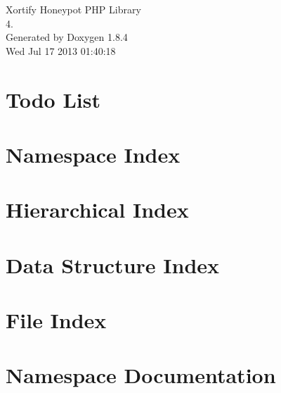 \documentclass[twoside]{book}
\newcommand{\clearemptydoublepage}{%
  \newpage{\pagestyle{empty}\cleardoublepage}%
}
\begin{document}
\hypersetup{pageanchor=false}
\begin{titlepage}
\vspace*{7cm}
\begin{center}%
{\Large Xortify Honeypot P\-H\-P Library \\[1ex]\large 4. }\\
\vspace*{1cm}
{\large Generated by Doxygen 1.8.4}\\
\vspace*{0.5cm}
{\small Wed Jul 17 2013 01:40:18}\\
\end{center}
\end{titlepage}
\clearemptydoublepage
\tableofcontents
\clearemptydoublepage
{}
\hypersetup{pageanchor=true}

\chapter{Todo List}
\label{todo}
\hypertarget{todo}{}

\chapter{Namespace Index}

\chapter{Hierarchical Index}

\chapter{Data Structure Index}

\chapter{File Index}

\chapter{Namespace Documentation}



\end{document}

